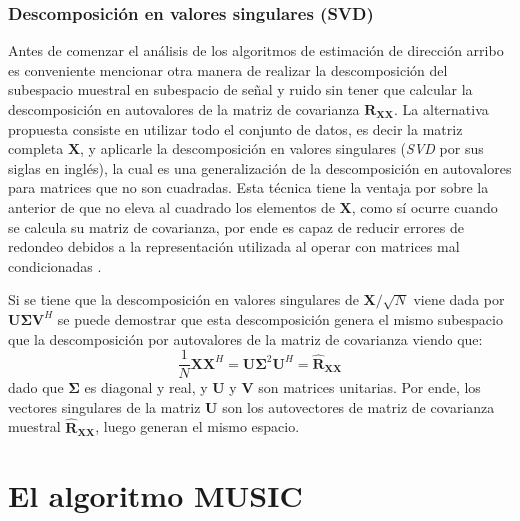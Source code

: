 \subsubsection{Descomposición en valores singulares (SVD)}
Antes de comenzar el análisis de los algoritmos de estimación de dirección arribo es conveniente mencionar otra manera de realizar la descomposición del subespacio muestral en subespacio de señal y ruido sin tener que calcular la descomposición en autovalores de la matriz de covarianza $\mathbf{R_{XX}}$.
La alternativa propuesta consiste en utilizar todo el conjunto de datos, es decir la matriz completa $\mathbf{X}$, y aplicarle la descomposición en valores singulares (\emph{SVD} por sus siglas en inglés), la cual es una generalización de la descomposición en autovalores para matrices que no son cuadradas. Esta técnica tiene la ventaja por sobre la anterior de que no eleva al cuadrado los elementos de $\mathbf{X}$, como sí ocurre cuando se calcula su matriz de covarianza, por ende es capaz de reducir errores de redondeo debidos a la representación utilizada al operar con matrices mal condicionadas \cite{bib:esprit_roy}.

Si se tiene que la descomposición en valores singulares de $\mathbf{X}/\sqrt{N}$ viene dada por $\mathbf{U\Sigma V}^H$ se puede demostrar que esta descomposición genera el mismo subespacio que la descomposición por autovalores de la matriz de covarianza viendo que:
\begin{equation}
    \frac{1}{N} \mathbf{XX}^H= \mathbf{U\Sigma}^2\mathbf{U}^H=\mathbf{\hat{R}_{XX}}
\end{equation}
dado que $\mathbf{\Sigma}$ es diagonal y real, y $\mathbf{U}$ y $\mathbf{V}$ son matrices unitarias. Por ende, los vectores singulares de la matriz $\mathbf{U}$ son los autovectores de matriz de covarianza muestral $\mathbf{\hat{R}_{XX}}$, luego generan el mismo espacio.

\section{El algoritmo MUSIC}\label{subc:doaest_MUSIC}

